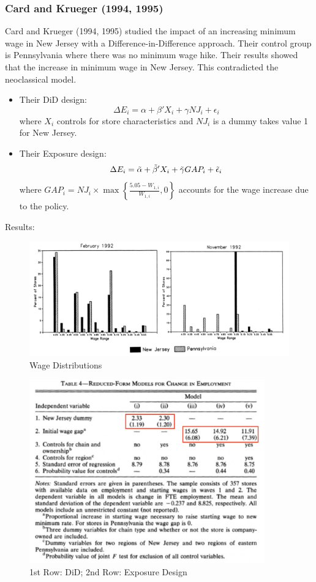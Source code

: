         \subsubsection{Card and Krueger (1994, 1995)}
            Card and Krueger (1994, 1995) studied the impact of an increasing minimum wage in New Jersey with a Difference-in-Difference approach. Their control group is Pennsylvania where there was no minimum wage hike. Their results showed that the increase in minimum wage  in New Jersey. This contradicted the neoclassical model.
            \begin{itemize}
                \item Their DiD design:
                $$\Delta E_i = \alpha + \beta 'X_i + \gamma NJ_i + \epsilon_i$$
                where $X_i$ controls for store characteristics and $NJ_i$ is a dummy takes value 1 for New Jersey.
                \item Their Exposure design:
                $$\Delta E_i = \Tilde{\alpha} +\Tilde{\beta} 'X_i +\Tilde{\gamma} GAP_i + \Tilde{\epsilon}_i$$
                where $GAP_i = NJ_i \times \max \left\{\frac{5.05 - W_{1,i}}{W_{1,i}},0\right\}$ accounts for the wage increase due to the policy.
            \end{itemize}
            Results:
            \begin{figure}[H]
                \centering
                \includegraphics[width=5in]{images/ch2/New Jersey.png}
                \caption{Wage Distributions}
            \end{figure}
            \begin{figure}[H]
                \centering
                \includegraphics[width=4in]{images/ch2/New_Jersey 2.png}
                \caption{1st Row: DiD; 2nd Row: Exposure Design}
            \end{figure}
